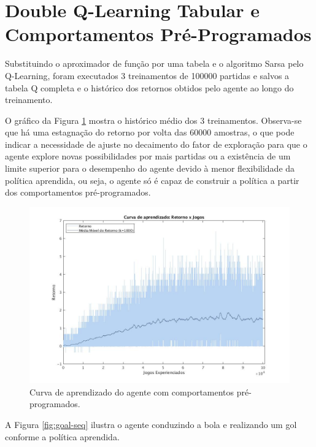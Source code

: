 \section{Double Q-Learning Tabular e Comportamentos Pré-Programados}
\label{sec:behaviors-tabular}
Substituindo o aproximador de função por uma tabela e o algoritmo Sarsa pelo Q-Learning, foram executados 3 treinamentos de 100000 partidas e salvos a tabela Q completa e o histórico dos retornos obtidos pelo agente ao longo do treinamento.

O gráfico da Figura \ref{fig:single-agent-tabular-behaviors} mostra o histórico médio dos 3 treinamentos. Observa-se que
há uma estagnação do retorno por volta das 60000 amostras, o que pode indicar a necessidade de ajuste no decaimento do fator de exploração para que o agente explore novas possibilidades por mais partidas ou a existência de um limite superior para o desempenho do agente devido à menor flexibilidade da política aprendida, ou seja, o agente só é capaz de construir a política a partir dos comportamentos pré-programados.

\begin{figure}[H]
	\includegraphics[width=0.9\linewidth]{figs/curva-behaviors-tabular.jpg}
	\centering
	\caption{Curva de aprendizado do agente com comportamentos pré-programados.}
	\label{fig:single-agent-tabular-behaviors}
\end{figure}

A Figura \ref{fig:goal-seq} ilustra o agente conduzindo a bola e realizando um gol conforme a política aprendida.

